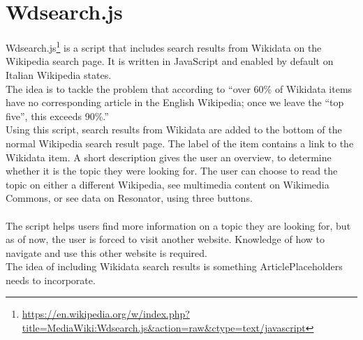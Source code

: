 \section{Wdsearch.js}
Wdsearch.js\footnote{\url{https://en.wikipedia.org/w/index.php?title=MediaWiki:Wdsearch.js&action=raw&ctype=text/javascript}} is a script that includes search results from Wikidata on the Wikipedia search page. It is written in JavaScript and enabled by default on Italian Wikipedia \citet{gerardm:01} states. \\
The idea is to tackle the problem that according to \citet{manske:01} ``over 60\% of Wikidata items have no corresponding article in the English Wikipedia; once we leave the ``top five'', this exceeds 90\%.'' \\
Using this script, search results from Wikidata are added to the bottom of the normal Wikipedia search result page. The label of the item contains a link to the Wikidata item. A short description gives the user an overview, to determine whether it is the topic they were looking for. The user can choose to read the topic on either a different Wikipedia, see multimedia content on Wikimedia Commons, or see data on Resonator, using three buttons. \\
\\
The script helps users find more information on a topic they are looking for, but as of now, the user is forced to visit another website. Knowledge of how to navigate and use this other website is required. \\
The idea of including Wikidata search results is something ArticlePlaceholders needs to incorporate.
